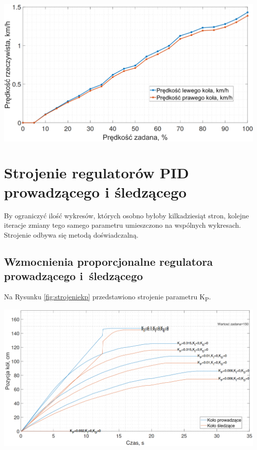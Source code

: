 \begin{center}
    \includegraphics[scale=0.31]{images/charStat.png}
    \label{fig:charstatjalowy}
\end{center}
\vspace*{-1cm}

\section{Strojenie regulatorów PID prowadzącego i śledzącego}
By ograniczyć ilość wykresów, których osobno byłoby kilkadziesiąt stron, kolejne iteracje zmiany tego samego parametru umieszczono na wspólnych wykresach. Strojenie odbywa się metodą doświadczalną.
\vspace*{-0.5cm}

\subsection*{Wzmocnienia proporcjonalne regulatora prowadzącego i~śledzącego}
Na Rysunku \ref{fig:strojeniekp} przedstawiono strojenie parametru K\textsubscript{P}.

\begin{center}
    \includegraphics[scale=0.4]{images/strojenieKp.png}
    \label{fig:strojeniekp}
\end{center}

